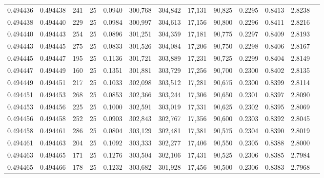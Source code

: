 \begin{tabular}{rrrrrrrrrrrrr}
0.494436 & 0.494438 &   241 &  25 &                                     0.0940 & 300,768 & 304,842 &  17,131 &  90,825 & 0.2295 & 0.8413 & 2.8238 \\
0.494438 & 0.494440 &   229 &  25 &                                     0.0984 & 300,997 & 304,613 &  17,156 &  90,800 & 0.2296 & 0.8411 & 2.8216 \\
0.494440 & 0.494443 &   254 &  25 &                                     0.0896 & 301,251 & 304,359 &  17,181 &  90,775 & 0.2297 & 0.8409 & 2.8193 \\
0.494443 & 0.494445 &   275 &  25 &                                     0.0833 & 301,526 & 304,084 &  17,206 &  90,750 & 0.2298 & 0.8406 & 2.8167 \\
0.494445 & 0.494447 &   195 &  25 &                                     0.1136 & 301,721 & 303,889 &  17,231 &  90,725 & 0.2299 & 0.8404 & 2.8149 \\
0.494447 & 0.494449 &   160 &  25 &                                     0.1351 & 301,881 & 303,729 &  17,256 &  90,700 & 0.2300 & 0.8402 & 2.8135 \\
0.494449 & 0.494451 &   217 &  25 &                                     0.1033 & 302,098 & 303,512 &  17,281 &  90,675 & 0.2300 & 0.8399 & 2.8114 \\
0.494451 & 0.494453 &   268 &  25 &                                     0.0853 & 302,366 & 303,244 &  17,306 &  90,650 & 0.2301 & 0.8397 & 2.8090 \\
0.494453 & 0.494456 &   225 &  25 &                                     0.1000 & 302,591 & 303,019 &  17,331 &  90,625 & 0.2302 & 0.8395 & 2.8069 \\
0.494456 & 0.494458 &   252 &  25 &                                     0.0903 & 302,843 & 302,767 &  17,356 &  90,600 & 0.2303 & 0.8392 & 2.8045 \\
0.494458 & 0.494461 &   286 &  25 &                                     0.0804 & 303,129 & 302,481 &  17,381 &  90,575 & 0.2304 & 0.8390 & 2.8019 \\
0.494461 & 0.494463 &   204 &  25 &                                     0.1092 & 303,333 & 302,277 &  17,406 &  90,550 & 0.2305 & 0.8388 & 2.8000 \\
0.494463 & 0.494465 &   171 &  25 &                                     0.1276 & 303,504 & 302,106 &  17,431 &  90,525 & 0.2306 & 0.8385 & 2.7984 \\
0.494465 & 0.494466 &   178 &  25 &                                     0.1232 & 303,682 & 301,928 &  17,456 &  90,500 & 0.2306 & 0.8383 & 2.7968 \\

\end{tabular}
